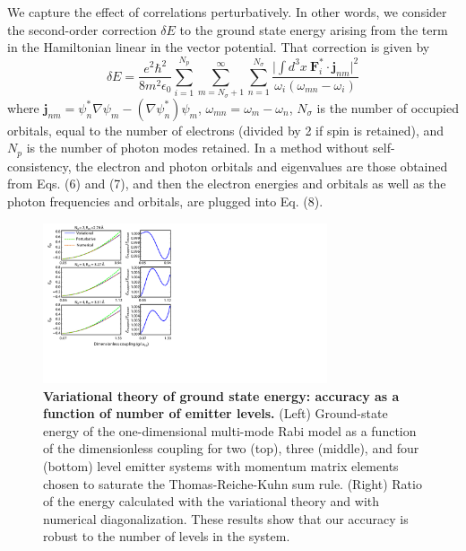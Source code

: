 \documentclass[aps,prl,twocolumn,
	groupedaddress,superscriptaddress,
	amsfonts,amssymb,amsmath,floatfix,
	citeautoscript]{revtex4-1}
\begin{document}
We capture the effect of correlations perturbatively. In other words, we consider the second-order correction $\delta E$ to the ground state energy arising from the term in the Hamiltonian linear in the vector potential. That correction is given by 
\begin{equation}
\delta E = \frac{e^2\hbar^2}{8m^2\epsilon_0}\sum\limits_{i=1}^{N_p}\sum_{m=N_{\sigma}+1}^{\infty}\sum\limits_{n=1}^{N_{\sigma}} \frac{\Big| \int d^3x~\mathbf{F}_i^*\cdot\mathbf{j}_{nm}\Big|^2}{\omega_i(\omega_{mn} -\omega_i)}
\end{equation}
where $\mathbf{j}_{nm} = \psi^*_n\nabla\psi_m - (\nabla\psi^*_n)\psi_m$, $\omega_{mn} = \omega_m - \omega_n$, $N_{\sigma}$ is the number of occupied orbitals, equal to the number of electrons (divided by 2 if spin is retained), and $N_p$ is the number of photon modes retained.  In a method without self-consistency, the electron and photon orbitals and eigenvalues are those obtained from Eqs. (6) and (7), and then the electron energies and orbitals as well as the photon frequencies and orbitals, are plugged into Eq. (8).
\begin{figure}[t]
\includegraphics[width=8.4cm]{figure3new.pdf}
\caption{\textbf{Variational theory of ground state energy: accuracy as a function of number of emitter levels.} (Left) Ground-state energy of the one-dimensional multi-mode Rabi model as a function of the dimensionless coupling for two (top), three (middle), and four (bottom) level emitter systems with momentum matrix elements chosen to saturate the Thomas-Reiche-Kuhn sum rule. (Right) Ratio of the energy calculated with the variational theory and with numerical diagonalization. These results show that our accuracy is robust to the number of levels in the system. }
\label{fig:ansatz}
\end{figure}
\end{document}
